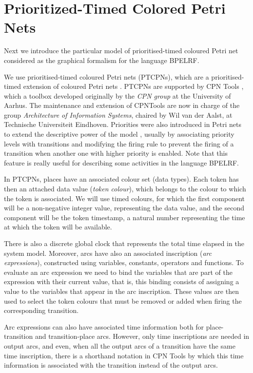 \section{Prioritized-Timed Colored Petri Nets}\label{petrinet}

Next we introduce the particular model of prioritised-timed
coloured Petri net considered as the graphical formalism for the language BPELRF. 
 
We use prioritised-timed coloured Petri nets (PTCPNs), 
which are
a prioritised-timed extension of coloured Petri nets \cite{Jensen97}. PTCPNs 
are supported by CPN Tools \cite{CPNTools}, which a toolbox
developed originally by the \emph{CPN group} at the University of Aarhus. The maintenance and extension of CPNTools are now in charge
of the group \emph{Architecture of Information Systems}, chaired by Wil van der Aalst, at Technische Universiteit Eindhoven.
Priorities were also introduced in Petri nets to extend the descriptive 
power of the model \cite{Bau96,BestK92,Pet81}, usually by
associating priority levels with transitions and modifying the firing
rule to prevent the firing of a transition when another one with
higher priority is enabled. Note that this feature is really useful  for describing some activities
in the language BPELRF.

In PTCPNs, places have an associated colour set (data types). 
Each token has then an attached data value
({\em token colour}),
which belongs to the colour to which the token is
associated. We will use timed colours, for which the first component
will be a non-negative integer value, representing the data value,
and the second component will be the token timestamp,
a natural number representing the time at which the 
token will be available.

There is also a discrete global clock that represents
the total time elapsed in the system model. Moreover, arcs have also 
an associated inscription ({\em arc expressions}),
constructed using variables, constants, operators
and functions. 
To evaluate an arc expression we need to
bind the variables that are part of the expression with their current value, that is, this binding
consists of assigning a value to the variables that appear in the
arc inscription. These values are then used to
select the token colours that must be removed or added when
firing the corresponding transition.

Arc expressions can also have associated time information
both for place-transition and transition-place arcs.
However, only time inscriptions are needed
in output arcs, and even, when all the output arcs
of a transition have the same time inscription,
there is a shorthand notation in CPN Tools
by which this time information is associated with
the transition instead of the output arcs.

